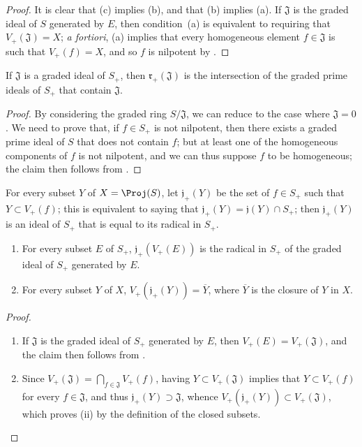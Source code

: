 \begin{proof}
It is clear that (c) implies (b), and that (b) implies (a).
If $\mathfrak{J}$ is the graded ideal of $S$ generated by $E$, then condition~(a) is equivalent to requiring that $V_+(\mathfrak{J})=X$;
\emph{a fortiori}, (a) implies that every homogeneous element $f\in\mathfrak{J}$ is such that $V_+(f)=X$, and so $f$ is nilpotent by .
\end{proof}

\begin{corollary}[2.3.9]
\label{II.2.3.9}
If $\mathfrak{J}$ is a graded ideal of $S_+$, then $\mathfrak{r}_+(\mathfrak{J})$ is the intersection of the graded prime ideals of $S_+$ that contain $\mathfrak{J}$.
\end{corollary}

\begin{proof}
By considering the graded ring $S/\mathfrak{J}$, we can reduce to the case where $\mathfrak{J}=0$.
We need to prove that, if $f\in S_+$ is not nilpotent, then there exists a graded prime ideal of $S$ that does not contain $f$;
but at least one of the homogeneous components of $f$ is not nilpotent, and we can thus suppose $f$ to be homogeneous;
the claim then follows from .
\end{proof}

\begin{env}[2.3.10]
\label{II.2.3.10}
For every subset $Y$ of $X=\Proj(S)$, let $\mathfrak{j}_+(Y)$ be the set of $f\in S_+$ such that $Y\subset V_+(f)$;
this is equivalent to saying that $\mathfrak{j}_+(Y)=\mathfrak{j}(Y)\cap S_+$;
then $\mathfrak{j}_+(Y)$ is an ideal of $S_+$ that is equal to its radical in $S_+$.
\end{env}

\begin{proposition}[2.3.11]
\label{II.2.3.11}
\begin{enumerate}
  \item[{\rm(i)}] For every subset $E$ of $S_+$, $\mathfrak{j}_+(V_+(E))$ is the radical in $S_+$ of the graded ideal of $S_+$ generated by $E$.
  \item[{\rm(ii)}] For every subset $Y$ of $X$, $V_+(\mathfrak{j}_+(Y))=\overline{Y}$, where $\overline{Y}$ is the closure of $Y$ in $X$.
\end{enumerate}
\end{proposition}

\begin{proof}
\medskip\noindent
\begin{enumerate}
  \item[{\rm(i)}] If $\mathfrak{J}$ is the graded ideal of $S_+$ generated by $E$, then $V_+(E)=V_+(\mathfrak{J})$, and the claim then follows from .
  \item[{\rm(ii)}] Since $V_+(\mathfrak{J})=\bigcap_{f\in\mathfrak{J}}V_+(f)$, having $Y\subset V_+(\mathfrak{J})$ implies that $Y\subset V_+(f)$ for every $f\in\mathfrak{J}$, and thus $\mathfrak{j}_+(Y)\supset\mathfrak{J}$, whence $V_+(\mathfrak{j}_+(Y))\subset V_+(\mathfrak{J})$, which proves (ii) by the definition of the closed subsets.
\end{enumerate}
\end{proof}

